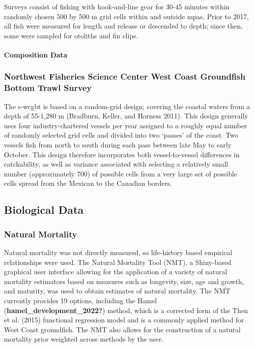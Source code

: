 \documentclass[11pt,
  english,
  letterpaper,
]{article}
\begin{document}
Surveys consist of fishing with hook-and-line gear for 30-45 minutes within randomly chosen 500 by 500 m grid cells within and outside \glspl{mpa}. Prior to 2017, all fish were measured for length and release or descended to depth; since then, some were sampled for otoliths and fin clips.

\hypertarget{composition-data-2}{%
\paragraph{Composition Data}\label{composition-data-2}}

\hypertarget{northwest-fisheries-science-center-west-coast-groundfish-bottom-trawl-survey}{%
\subsubsection{Northwest Fisheries Science Center West Coast Groundfish Bottom Trawl Survey}\label{northwest-fisheries-science-center-west-coast-groundfish-bottom-trawl-survey}}

\hfill\break

The \Gls{s-wcgbt} is based on a random-grid design; covering the coastal waters from a depth of 55-1,280 m (Bradburn, Keller, and Horness 2011). This design generally uses four industry-chartered vessels per year assigned to a roughly equal number of randomly selected grid cells and divided into two `passes' of the coast. Two vessels fish from north to south during each pass between late May to early October. This design therefore incorporates both vessel-to-vessel differences in catchability, as well as variance associated with selecting a relatively small number (approximately 700) of possible cells from a very large set of possible cells spread from the Mexican to the Canadian borders.

\hypertarget{biological-data}{%
\subsection{Biological Data}\label{biological-data}}

\hypertarget{natural-mortality}{%
\subsubsection{Natural Mortality}\label{natural-mortality}}

\hfill\break

Natural mortality was not directly measured, so life-history based empirical relationships were used. The Natural Mortality Tool (NMT), a Shiny-based graphical user interface allowing for the application of a variety of natural mortality estimators based on measures such as longevity, size, age and growth, and maturity, was used to obtain estimates of natural mortality. The NMT currently provides 19 options, including the Hamel (\textbf{hamel\_development\_2022?}) method, which is a corrected form of the Then et al. (2015) functional regression model and is a commonly applied method for West Coast groundfish. The NMT also allows for the construction of a natural mortality prior weighted across methods by the user.
\end{document}
